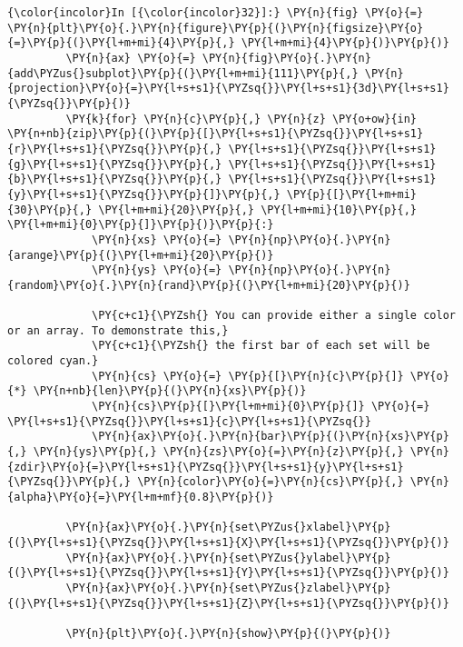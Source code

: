     \begin{Verbatim}[commandchars=\\\{\},frame=single,framerule=0.3mm,rulecolor=\color{cellframecolor}]
{\color{incolor}In [{\color{incolor}32}]:} \PY{n}{fig} \PY{o}{=} \PY{n}{plt}\PY{o}{.}\PY{n}{figure}\PY{p}{(}\PY{n}{figsize}\PY{o}{=}\PY{p}{(}\PY{l+m+mi}{4}\PY{p}{,} \PY{l+m+mi}{4}\PY{p}{)}\PY{p}{)}
         \PY{n}{ax} \PY{o}{=} \PY{n}{fig}\PY{o}{.}\PY{n}{add\PYZus{}subplot}\PY{p}{(}\PY{l+m+mi}{111}\PY{p}{,} \PY{n}{projection}\PY{o}{=}\PY{l+s+s1}{\PYZsq{}}\PY{l+s+s1}{3d}\PY{l+s+s1}{\PYZsq{}}\PY{p}{)}
         \PY{k}{for} \PY{n}{c}\PY{p}{,} \PY{n}{z} \PY{o+ow}{in} \PY{n+nb}{zip}\PY{p}{(}\PY{p}{[}\PY{l+s+s1}{\PYZsq{}}\PY{l+s+s1}{r}\PY{l+s+s1}{\PYZsq{}}\PY{p}{,} \PY{l+s+s1}{\PYZsq{}}\PY{l+s+s1}{g}\PY{l+s+s1}{\PYZsq{}}\PY{p}{,} \PY{l+s+s1}{\PYZsq{}}\PY{l+s+s1}{b}\PY{l+s+s1}{\PYZsq{}}\PY{p}{,} \PY{l+s+s1}{\PYZsq{}}\PY{l+s+s1}{y}\PY{l+s+s1}{\PYZsq{}}\PY{p}{]}\PY{p}{,} \PY{p}{[}\PY{l+m+mi}{30}\PY{p}{,} \PY{l+m+mi}{20}\PY{p}{,} \PY{l+m+mi}{10}\PY{p}{,} \PY{l+m+mi}{0}\PY{p}{]}\PY{p}{)}\PY{p}{:}
             \PY{n}{xs} \PY{o}{=} \PY{n}{np}\PY{o}{.}\PY{n}{arange}\PY{p}{(}\PY{l+m+mi}{20}\PY{p}{)}
             \PY{n}{ys} \PY{o}{=} \PY{n}{np}\PY{o}{.}\PY{n}{random}\PY{o}{.}\PY{n}{rand}\PY{p}{(}\PY{l+m+mi}{20}\PY{p}{)}
         
             \PY{c+c1}{\PYZsh{} You can provide either a single color or an array. To demonstrate this,}
             \PY{c+c1}{\PYZsh{} the first bar of each set will be colored cyan.}
             \PY{n}{cs} \PY{o}{=} \PY{p}{[}\PY{n}{c}\PY{p}{]} \PY{o}{*} \PY{n+nb}{len}\PY{p}{(}\PY{n}{xs}\PY{p}{)}
             \PY{n}{cs}\PY{p}{[}\PY{l+m+mi}{0}\PY{p}{]} \PY{o}{=} \PY{l+s+s1}{\PYZsq{}}\PY{l+s+s1}{c}\PY{l+s+s1}{\PYZsq{}}
             \PY{n}{ax}\PY{o}{.}\PY{n}{bar}\PY{p}{(}\PY{n}{xs}\PY{p}{,} \PY{n}{ys}\PY{p}{,} \PY{n}{zs}\PY{o}{=}\PY{n}{z}\PY{p}{,} \PY{n}{zdir}\PY{o}{=}\PY{l+s+s1}{\PYZsq{}}\PY{l+s+s1}{y}\PY{l+s+s1}{\PYZsq{}}\PY{p}{,} \PY{n}{color}\PY{o}{=}\PY{n}{cs}\PY{p}{,} \PY{n}{alpha}\PY{o}{=}\PY{l+m+mf}{0.8}\PY{p}{)}
         
         \PY{n}{ax}\PY{o}{.}\PY{n}{set\PYZus{}xlabel}\PY{p}{(}\PY{l+s+s1}{\PYZsq{}}\PY{l+s+s1}{X}\PY{l+s+s1}{\PYZsq{}}\PY{p}{)}
         \PY{n}{ax}\PY{o}{.}\PY{n}{set\PYZus{}ylabel}\PY{p}{(}\PY{l+s+s1}{\PYZsq{}}\PY{l+s+s1}{Y}\PY{l+s+s1}{\PYZsq{}}\PY{p}{)}
         \PY{n}{ax}\PY{o}{.}\PY{n}{set\PYZus{}zlabel}\PY{p}{(}\PY{l+s+s1}{\PYZsq{}}\PY{l+s+s1}{Z}\PY{l+s+s1}{\PYZsq{}}\PY{p}{)}
         
         \PY{n}{plt}\PY{o}{.}\PY{n}{show}\PY{p}{(}\PY{p}{)}
\end{Verbatim}


